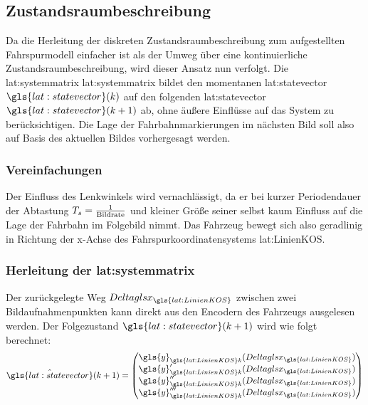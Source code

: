 \subsection{Zustandsraumbeschreibung}
Da die Herleitung der diskreten Zustandsraumbeschreibung zum aufgestellten Fahrspurmodell einfacher ist als der Umweg über eine kontinuierliche Zustandsraumbeschreibung, wird dieser Ansatz nun verfolgt.
Die \glsdesc{lat:systemmatrix} \gls{lat:systemmatrix} bildet den momentanen \glsdesc{lat:statevector} \(\gls{lat:statevector}(\scl{k})\) auf den folgenden \glsdesc{lat:statevector} \(\gls{lat:statevector}(\scl{k}+1)\) ab, ohne äußere Einflüsse auf das System zu berücksichtigen. Die Lage der Fahrbahnmarkierungen im nächsten Bild soll also auf Basis des aktuellen Bildes vorhergesagt werden.

\subsubsection{Vereinfachungen}
Der Einfluss des Lenkwinkels wird vernachlässigt, da er bei kurzer Periodendauer der Abtastung \(T_s = \frac{1}{\text{Bildrate}}\) und kleiner Größe seiner selbst kaum Einfluss auf die Lage der Fahrbahn im Folgebild nimmt. Das Fahrzeug bewegt sich also geradlinig in Richtung der x-Achse des Fahrspurkoordinatensystems \gls{lat:LinienKOS}. 

\subsubsection{Herleitung der \glsdesc{lat:systemmatrix}}
Der zurückgelegte Weg \begin{math} \scl{Deltagls{x}}_{\gls{lat:LinienKOS}} \end{math} zwischen zwei Bildaufnahmenpunkten kann direkt aus den Encodern des Fahrzeugs ausgelesen werden. Der Folgezustand  \(\gls{lat:statevector}(\scl{k}+1)\) wird wie folgt berechnet:
\begin{equation}
\label{eq:nextstatemapping}
\hat{\gls{lat:statevector}}(\scl{k}+1) =
\begin{pmatrix}
\gls{y}_{\gls{lat:LinienKOS}\scl{k}}(\scl{Deltagls{x}}_{\gls{lat:LinienKOS}}) \\
\der{\gls{y}_{\gls{lat:LinienKOS}\scl{k}}}(\scl{Deltagls{x}}_{\gls{lat:LinienKOS}}) \\
\derII{\gls{y}_{\gls{lat:LinienKOS}\scl{k}}}(\scl{Deltagls{x}}_{\gls{lat:LinienKOS}}) \\
\derIII{\gls{y}_{\gls{lat:LinienKOS}\scl{k}}}(\scl{Deltagls{x}}_{\gls{lat:LinienKOS}}) \\
\end{pmatrix}
\end{equation}

